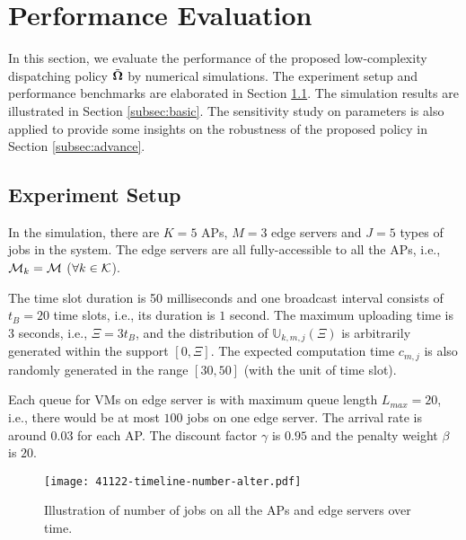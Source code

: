 \section{Performance Evaluation}
\label{sec:evaluation}
In this section, we evaluate the performance of the proposed low-complexity dispatching policy $\tilde{\boldsymbol{\Omega}}$ by numerical simulations.
The experiment setup and performance benchmarks are elaborated in Section \ref{subsec:setup}.
The simulation results are illustrated in Section \ref{subsec:basic}.
The sensitivity study on parameters is also applied to provide some insights on the robustness of the proposed policy in Section \ref{subsec:advance}.

\subsection{Experiment Setup}
\label{subsec:setup}
In the simulation, there are $K=5$ APs, $M=3$ edge servers and $J=5$ types of jobs in the system.
The edge servers are all fully-accessible to all the APs, i.e., $\mathcal{M}_{k}=\mathcal{M}$ ($\forall k\in\mathcal{K}$).

The time slot duration is 50 milliseconds and one broadcast interval consists of $t_{B}=20$ time slots, i.e., its duration is $1$ second.
The maximum uploading time is $3$ seconds, i.e., $\Xi = 3t_B$, and the distribution of $\mathbb{U}_{k,m,j}(\Xi)$ is arbitrarily generated within the support $[0, \Xi]$.
The expected computation time $c_{m,j}$ is also randomly generated in the range $[30,50]$ (with the unit of time slot).

Each queue for VMs on edge server is with maximum queue length $L_{max}=20$, i.e., there would be at most $100$ jobs on one edge server.
The arrival rate is around $0.03$ for each AP.
The discount factor $\gamma$ is $0.95$ and the penalty weight $\beta$ is $20$.

\begin{figure}[ht!]                                                                             %
    \centering                                                                                  %
    \texttt{[image: 41122-timeline-number-alter.pdf]}                     %
    \caption{Illustration of number of jobs on all the APs and edge servers over time.}
    \label{fig:general_timeline}                                                                %
\end{figure}                                                                                    %

